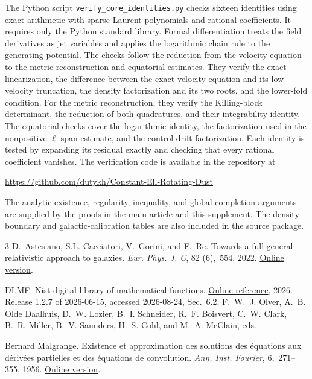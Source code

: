 \documentclass[11pt,a4paper]{article}
\numberwithin{equation}{section}
\theoremstyle{plain}
\theoremstyle{definition}
\theoremstyle{remark}
\begin{document}
The Python script \texttt{verify\_core\_identities.py} checks sixteen
identities using exact arithmetic with sparse Laurent polynomials
and rational coefficients. It requires only the Python standard
library. Formal differentiation treats the field derivatives as jet
variables and applies the logarithmic chain rule to the generating
potential. The checks follow the reduction from the velocity equation to the
metric reconstruction and equatorial estimates. They verify the exact
linearization, the difference between the exact velocity equation and
its low-velocity truncation, the density factorization and its two
roots, and the lower-fold condition. For the metric reconstruction,
they verify the Killing-block determinant, the reduction of both
quadratures, and their integrability identity. The equatorial checks
cover the logarithmic identity, the factorization used in the
nonpositive-$\ell$ span estimate, and the control-drift factorization.
Each identity is tested by expanding its residual exactly and checking
that every rational coefficient vanishes. The verification code is available in the repository at
\begin{center}
  \url{https://github.com/dutykh/Constant-Ell-Rotating-Dust}
\end{center}

The analytic existence, regularity, inequality, and global
completion arguments are supplied by the proofs in the main article and
this supplement. The density-boundary and galactic-calibration tables are
also included in the source package.

{\small
\begin{thebibliography}{3}
\providecommand{\natexlab}[1]{#1}
D.~Astesiano, S.L. Cacciatori, V.~Gorini, and F.~Re.
\newblock Towards a full general relativistic approach to galaxies.
\newblock \emph{Eur. Phys. J. C}, 82 (6),\  554, 2022.
\newblock \href{https://doi.org/10.1140/epjc/s10052-022-10506-7}{Online version}.

DLMF.
\newblock Nist digital library of mathematical functions.
\newblock \href{https://dlmf.nist.gov/}{Online reference}, 2026.
\newblock Release 1.2.7 of 2026-06-15, accessed 2026-08-24, Sec.~6.2. F.~W.~J.
  Olver, A.~B. Olde Daalhuis, D.~W. Lozier, B.~I. Schneider, R.~F. Boisvert,
  C.~W. Clark, B.~R. Miller, B.~V. Saunders, H.~S. Cohl, and M.~A. McClain,
  eds.

Bernard Malgrange.
\newblock Existence et approximation des solutions des {\'e}quations aux
  d{\'e}riv{\'e}es partielles et des {\'e}quations de convolution.
\newblock \emph{Ann. Inst. Fourier}, 6,\  271--355, 1956.
\newblock \href{https://doi.org/10.5802/aif.65}{Online version}.
\end{thebibliography}
}
\end{document}

